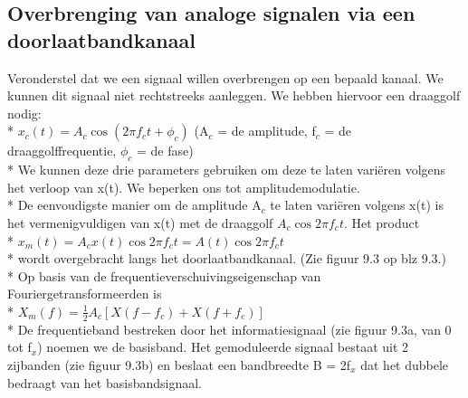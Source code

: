 \documentclass[10pt]{article}
\begin{document}
\subsection{Overbrenging van analoge signalen via een doorlaatbandkanaal}
Veronderstel dat we een signaal willen overbrengen op een bepaald kanaal. We kunnen dit signaal niet rechtstreeks aanleggen. We hebben hiervoor een draaggolf nodig:\\*
$x_c(t) = A_c\cos{(2\pi f_ct + \phi_c)}$ {\scriptsize (A$_c$ = de amplitude, f$_c$ = de draaggolffrequentie, $\phi_c$ = de fase)}\\*
We kunnen deze drie parameters gebruiken om deze te laten vari\"eren volgens het verloop van x(t). We beperken ons tot amplitudemodulatie.\\*
De eenvoudigste manier om de amplitude A$_c$ te laten vari\"eren volgens x(t) is het vermenigvuldigen van x(t) met de draaggolf $A_c\cos{2\pi f_ct}$. Het product\\*
$x_m(t) = A_cx(t)\cos{2\pi f_ct} = A(t)\cos{2\pi f_ct}$\\*
wordt overgebracht langs het doorlaatbandkanaal. {\scriptsize (Zie figuur 9.3 op blz 9.3.)}\\*
Op basis van de frequentieverschuivingseigenschap van Fouriergetransformeerden is\\*
$X_m(f) = \frac{1}{2}A_c\left[X(f-f_c) + X(f+f_c)\right]$\\*
De frequentieband bestreken door het informatiesignaal  (zie figuur 9.3a, van 0 tot f$_x$) noemen we de basisband. Het gemoduleerde signaal bestaat uit 2 zijbanden (zie figuur 9.3b) en beslaat een bandbreedte B = 2f$_x$ dat het dubbele bedraagt van het basisbandsignaal.
\end{document}
